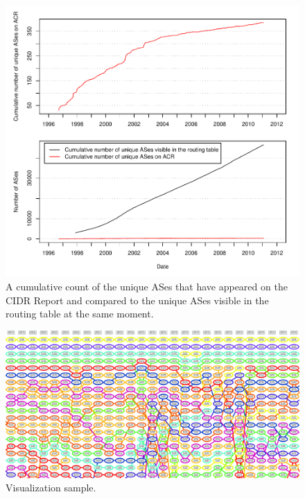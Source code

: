 \begin{figure}
    \includegraphics[width=6in]{figures/cumulative_asn_counts.pdf}
    \caption{A cumulative count of the unique ASes that have appeared on the CIDR Report and compared to the unique ASes visible in the routing table at the same moment.}
\end{figure}

\begin{figure}
    \includegraphics[width=6in]{figures/viz_sample.jpg}
    \caption{Visualization sample.}
\end{figure}





